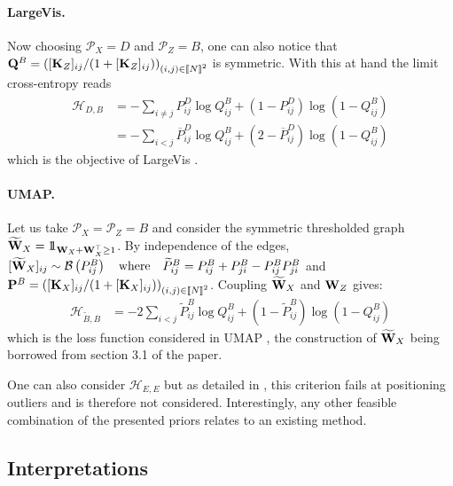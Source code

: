 \paragraph{LargeVis.}
Now choosing $\mathcal{P}_{X} = D$ and $\mathcal{P}_{Z} = B$, one can also notice that $\mathbf{Q}^{B} = \left( [\mathbf{K}_Z]_{ij} / (1+[\mathbf{K}_Z]_{ij}) \right)_{(i,j) \in {[\![N]\!]}^2}$ is symmetric. With this at hand the limit cross-entropy reads
\begin{align*}
    \mathcal{H}_{D,B} &= - \sum_{i \neq j} P^{D}_{ij} \log Q^{B}_{ij} + \left(1 - P^{D}_{ij} \right) \log\left(1-Q^{B}_{ij} \right) \\
    &= - \sum_{i < j} \overline{P}^{D}_{ij} \log Q^{B}_{ij} + \left(2-\overline{P}^{D}_{ij}\right) \log (1- Q^{B}_{ij})
\end{align*}
which is the objective of LargeVis \citep{tang2016visualizing}.

\paragraph{UMAP.}
Let us take $\mathcal{P}_{X} = \mathcal{P}_{Z} = B$ and consider the symmetric thresholded graph $\widetilde{{\mathbf{W}}}_{X} = 1\!\!1_{{\mathbf{W}}_{X} + {\mathbf{W}}_X^\top \geq 1}$. By independence of the edges, $[\widetilde{{\mathbf{W}}}_{X}]_{ij} \sim \mathcal{B}\left(P^{B}_{ij} \right) \quad \text{where} \quad  \widetilde{P}^{B}_{ij} = P^{B}_{ij} + P^{B}_{ji} - P^{B}_{ij} P^{B}_{ji}$ and $\mathbf{P}^{B} = \left( [\mathbf{K}_X]_{ij} / (1+[\mathbf{K}_X]_{ij}) \right)_{(i,j) \in {[\![N]\!]}^2}$. Coupling $\widetilde{{\mathbf{W}}}_{X}$ and ${\mathbf{W}}_{Z}$ gives:
\begin{align*}
    \mathcal{H}_{\widetilde{B},B} &= -2 \sum_{i<j} \widetilde{P}_{ij}^{B} \log Q_{ij}^{B} + \left(1 - \widetilde{P}_{ij}^{B} \right) \log \left( 1 - Q_{ij}^{B} \right)
\end{align*}
which is the loss function considered in UMAP \citep{mcinnes2018umap}, the construction of $\widetilde{{\mathbf{W}}}_{X}$ being borrowed from section 3.1 of the paper.

\begin{remark}
One can also consider $\mathcal{H}_{E,E}$ but as detailed in \citep{maaten2008tSNE}, this criterion fails at positioning outliers and is therefore not considered. 
Interestingly, any other feasible combination of the presented priors relates to an existing method.
\end{remark}

\subsection{Interpretations}\label{sec:interpretations}

